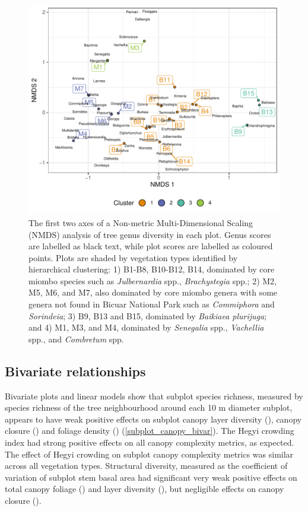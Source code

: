 \documentclass[11pt,a4paper]{article}
\begin{document}
\begin{figure}
	\includegraphics[width=\linewidth]{nmds}
	\caption[NMDS of plots based on genera basal area abundance]{The first two axes of a Non-metric Multi-Dimensional Scaling (NMDS) analysis of tree genus diversity in each plot. Genus scores are labelled as black text, while plot scores are labelled as coloured points. Plots are shaded by vegetation types identified by hierarchical clustering: 1) B1-B8, B10-B12, B14, dominated by core miombo species such as \textit{Julbernardia} spp., \textit{Brachystegia} spp.; 2) M2, M5, M6, and M7, also dominated by core miombo genera with some genera not found in Bicuar National Park such as \textit{Commiphora} and \textit{Sorindeia}; 3) B9, B13 and B15, dominated by \textit{Baikiaea plurijuga}; and 4) M1, M3, and M4, dominated by \textit{Senegalia} spp., \textit{Vachellia} spp., and \textit{Combretum} spp.}
	\label{nmds}
\end{figure}

\subsection{Bivariate relationships}

Bivariate plots and linear models show that subplot species richness, measured by species richness of the tree neighbourhood around each 10 m diameter subplot, appears to have weak positive effects on subplot canopy layer diversity (\richLayerDiv{}), canopy closure (\richCover{}) and foliage density (\richFoliage{}) (\autoref{subplot_canopy_bivar}). The Hegyi crowding index had strong positive effects on all canopy complexity metrics, as expected. The effect of Hegyi crowding on subplot canopy complexity metrics was similar across all vegetation types. Structural diversity, measured as the coefficient of variation of subplot stem basal area had significant very weak positive effects on total canopy foliage (\baCovFoliage{}) and layer diversity (\baCovLayerDiv{}), but negligible effects on canopy closure (\baCovCover). 
\end{document}
